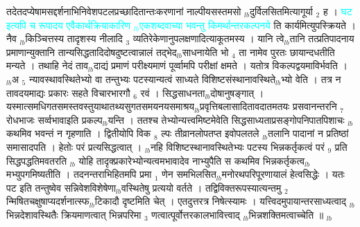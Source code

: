 \documentclass[article,12pt,a4paper]{memoir}%
\newcommand{\quotelemma}[1]{\textcolor{cyan}{#1}}
\newcounter{parCount}
\begin{document}
	  
	  \pstart \leavevmode%
	तदेतदप्येषामसद्दर्शनाभिनिवेशपटलप्रच्छादितान्तःकरणानां नाल्पीयसस्तमसो {\tiny $_{lb}$}दुर्विलसितमित्यागूर्या {\tiny $_{2}$} ह । \quotelemma{घट इत्यपि च रूपादय एवैकार्थक्रियाकारिण {\tiny $_{lb}$}एकशब्दवाच्या भवन्तु किमर्थान्तरकल्पनये} \cite[2b10]{vn-msN} ति कार्यमित्युपस्क्रियते । नैव {\tiny $_{lb}$}किञ्चित्तस्य तादृशस्य नीलादि {\tiny $_{3}$} व्यतिरेकेणानुपलक्षणादित्याकूतमस्य । यानि त्वे{\tiny $_{lb}$}तानि तत्प्रतिपादनाय प्रमाणान्युक्तानि तान्यसिद्धतादिदोषदुष्टत्वान्नालं तद्भेद{\tiny $_{lb}$}साधनायेति भो {\tiny $_{4}$} ता  नामेव पुरतः छायान्दधतीति मन्यते । तथाहि नेदं ताव{\tiny $_{lb}$}दाद्यं प्रमाणं परीक्ष्यमाणं पूर्व्वामपि परीक्षां क्षमते । यतोत्र विकल्पद्वयमाविर्भवति । {\tiny $_{lb}$}अ {\tiny $_{5}$} न्यावस्थावस्थितेभ्यो वा तन्तुभ्यः पटस्यान्यत्वं साध्यते विशिष्टसंस्थानावस्थिते{\tiny $_{lb}$}भ्यो वेति । तत्र न तावदयमाद्यः प्रकारः सहते विचारभारगौ {\tiny $_{6}$} रवं । सिद्धसाधनता{\tiny $_{lb}$}दोषानुषङ्गात् । यस्मात्समधिगतसमस्तवस्तुयाथातथ्यसुगतसमयनयसमाश्रय{\tiny $_{lb}$}प्रवृत्तिबलासादितावदातमतयः प्रसवानन्तरनि {\tiny $_{7}$} रोधभाजः सर्व्वभावाइति प्रकल्प{\tiny $_{lb}$}यन्ति । ततश्च तेभ्योन्यत्त्वमिष्टमेवेति सिद्धसाध्यताप्रसङ्गोपनिपातपिशाचः {\tiny $_{lb}$}कथमिव भवन्तं न गृहणाति । द्वितीयोपि विक {\tiny $_{8}$} ल्पः तीव्रानलोपतप्त इवोपलतले {\tiny $_{lb}$}तलानि पादानां न प्रतिष्ठां समासादपति । हेतोः परं प्रत्यसिद्धत्वात् । {\tiny $_{lb}$}नहि विशिष्टस्थानावस्थितेभ्यः पटस्य भिन्नकर्तृकत्वं परं {\tiny $_{9}$} \leavevmode{} प्रति सिद्धपद्धतिमवतरति {\tiny $_{lb}$} \leavevmode{} योहि तादृक्प्रकारेभ्योन्यत्वमभावादेव नाभ्युपैति स कथमिव भिन्नकर्तृकत्व{\tiny $_{lb}$}मभ्युपगमिष्यतीति । तदनन्तराभिहितमपि प्रमा {\tiny $_{1}$} णेन समभिलसित{\tiny $_{lb}$}मनोरथपरिपूरणायालं हेत्वसिद्धेः । यतः पट इति तन्तुष्वेव सन्निवेशविशेषेणा{\tiny $_{lb}$}वस्थितेषु प्रत्ययो वर्तते । तद्विविक्तरूपस्यात्यन्तमु {\tiny $_{2}$} न्मिषितचक्षुषाप्यदर्शनात्स्फ{\tiny $_{lb}$}टिकादौ दृष्टमिति चेत् । एतदुत्तरत्र निषेत्स्यामः । यत्त्विदमुपायान्तरसाध्यत्वाद् {\tiny $_{lb}$}भिन्नदेशावस्थितैः क्रियमाणत्वात् भिन्नपरिमा {\tiny $_{3}$} णत्वात्पूर्वोत्तरकालभावित्त्वाद् {\tiny $_{lb}$}भिन्नशक्तिमत्वाच्चेति ॥
	{}
	\pend%
      {\tiny $_{lb}$}
\end{document}

